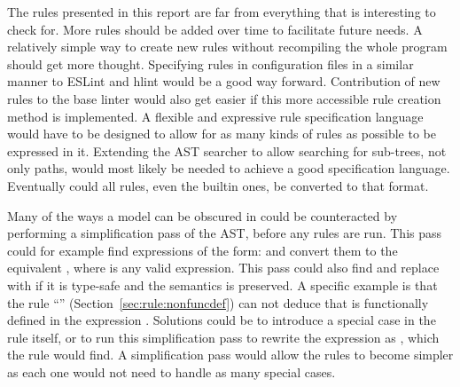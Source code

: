 \documentclass[a4paper,12pt]{article}
\newcommand{\ruleref}[1]{``\nameref{sec:rule:#1}'' (Section~\ref{sec:rule:#1})}
\begin{document}
The rules presented in this report are far from everything that is interesting to check
for. More rules should be added over time to facilitate future needs. A relatively simple
way to create new rules without recompiling the whole program should get more thought.
Specifying rules in configuration files in a similar manner to ESLint and hlint would be a
good way forward. Contribution of new rules to the base linter would also get easier if
this more accessible rule creation method is implemented. A flexible and expressive rule
specification language would have to be designed to allow for as many kinds of rules as
possible to be expressed in it. Extending the AST searcher to allow searching for
sub-trees, not only paths, would most likely be needed to achieve a good specification
language. Eventually could all rules, even the builtin ones, be converted to that format.

Many of the ways a model can be obscured in could be counteracted by performing a
simplification pass of the AST, before any rules are run. This pass could for example find
expressions of the form:  and convert them to the equivalent , where
 is any valid expression. This pass could also find \mi{[a]} and replace with 
if it is type-safe and the semantics is preserved. A specific example is that the rule
\ruleref{nonfuncdef} can not deduce that  is functionally defined in the expression
\mi{[a] = [b+1]}. Solutions could be to introduce a special case in the rule itself, or to
run this simplification pass to rewrite the expression as , which the rule
would find. A simplification pass would allow the rules to become simpler as each one
would not need to handle as many special cases.


%


\newpage


\newpage
\appendix
\end{document}

